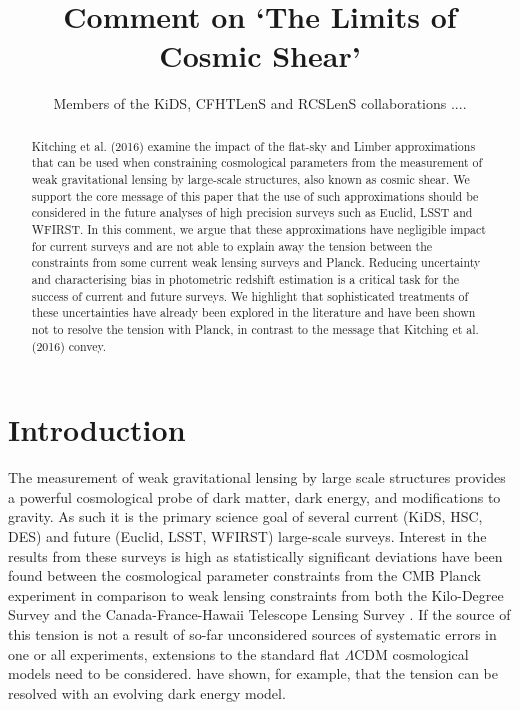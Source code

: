 \documentclass[preprint]{aastex}
\begin{document}
\title{\huge{Comment on `The Limits of Cosmic Shear'}}

\author{Members of the KiDS, CFHTLenS and RCSLenS collaborations ....}


\begin{abstract}
Kitching et al. (2016) examine the impact of the flat-sky and Limber approximations that can be used when constraining cosmological parameters from the measurement of weak gravitational lensing by large-scale structures, also known as cosmic shear.  We support the core message of this paper that the use of such approximations should be considered in the future analyses of high precision surveys such as Euclid, LSST and WFIRST.  In this comment, we argue that these approximations have negligible impact for current surveys and are not able to explain away the tension between the constraints from some current weak lensing surveys and Planck.  Reducing uncertainty and characterising bias in photometric redshift estimation is a critical task for the success of current and future surveys.  We highlight that sophisticated treatments of these uncertainties have already been explored in the literature and have been shown not to resolve the tension with Planck, in contrast to the message that Kitching et al. (2016) convey.

\end{abstract}
\section{Introduction}

The measurement of weak gravitational lensing by large scale structures provides a powerful cosmological probe of dark matter, dark energy, and modifications to gravity.  As such it is the primary science goal of several current (KiDS, HSC, DES) and future (Euclid, LSST, WFIRST) large-scale surveys. Interest in the results from these surveys is high as statistically significant deviations have been found between the cosmological parameter constraints from the CMB Planck experiment \citep{planck/cosmo:2015} in comparison to weak lensing constraints from both the Kilo-Degree Survey \citep[KiDS;][]{hildebrandt/etal:2016} and the Canada-France-Hawaii Telescope Lensing Survey \citep[CFHTLenS;][] {joudaki/etal:2016}.  If the source of this tension is not a result of so-far unconsidered sources of systematic errors in one or all experiments, extensions to the standard flat $\Lambda$CDM cosmological models need to be considered.  \citet{joudaki/etal:2017} have shown, for example, that the tension can be resolved with an evolving dark energy model.
\end{document}
